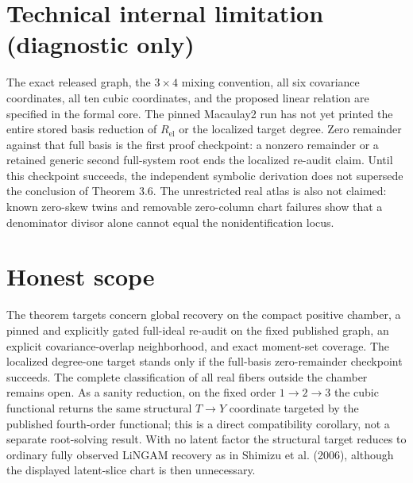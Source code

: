 \documentclass{article}
\begin{document}
\section*{Technical internal limitation (diagnostic only)}

The exact released graph, the \(3\times4\) mixing convention, all six covariance coordinates, all ten cubic coordinates, and the proposed linear relation are specified in the formal core. The pinned Macaulay2 run has not yet printed the entire stored basis reduction of \(R_{\mathrm{el}}\) or the localized target degree. Zero remainder against that full basis is the first proof checkpoint: a nonzero remainder or a retained generic second full-system root ends the localized re-audit claim. Until this checkpoint succeeds, the independent symbolic derivation does not supersede the conclusion of Theorem 3.6. The unrestricted real atlas is also not claimed: known zero-skew twins and removable zero-column chart failures show that a denominator divisor alone cannot equal the nonidentification locus.

\section{Honest scope}

The theorem targets concern global recovery on the compact positive chamber, a pinned and explicitly gated full-ideal re-audit on the fixed published graph, an explicit covariance-overlap neighborhood, and exact moment-set coverage. The localized degree-one target stands only if the full-basis zero-remainder checkpoint succeeds. The complete classification of all real fibers outside the chamber remains open. As a sanity reduction, on the fixed order \(1\to2\to3\) the cubic functional returns the same structural \(T\to Y\) coordinate targeted by the published fourth-order functional; this is a direct compatibility corollary, not a separate root-solving result. With no latent factor the structural target reduces to ordinary fully observed LiNGAM recovery as in Shimizu et al. (2006), although the displayed latent-slice chart is then unnecessary.
\end{document}

